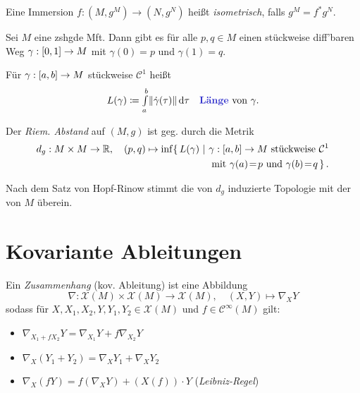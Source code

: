 \documentclass{cheat-sheet}
\newcommand{\abinterval}{\cinterval{a}{b}} %
\newcommand{\Cont}{\mathcal{C}} %
\newcommand{\VF}{\mathcal{X}} %
\begin{document}
\begin{defn}
  Eine Immersion $f : (M, g^M) \to (N, g^N)$ heißt \emph{isometrisch}, falls $g^M = f^* g^N$.
\end{defn}

\begin{prop}
  Sei $M$ eine zshgde Mft. Dann gibt es für alle $p, q \in M$ einen stückweise diff'baren Weg $\gamma : \left[ 0, 1 \right] \to M$ mit $\gamma(0) = p$ und $\gamma(1) = q$.
\end{prop}

\begin{defn}
  Für $\gamma : \abinterval \to M$ stückweise $\Cont^1$ heißt
  \[
    L(\gamma) \coloneqq \Int{a}{b}{\norm{\dot{\gamma}(\tau)}}{\tau}
    \quad \text{\emph{Länge} von $\gamma$.}
  \]
\end{defn}

\begin{defn}
  Der \emph{Riem. Abstand} auf $(M, g)$ ist geg. durch die Metrik
  \begin{align*}
    d_g : M \times M \to \R, \quad
    (p, q) \mapsto \inf \{\, L(\gamma) \,\,|\,\, & \gamma : \abinterval \to M \text{ stückweise } \Cont^{1}\\
    & \left. \text{mit $\gamma(a) \!=\! p$ und $\gamma(b) \!=\! q$} \, \right\}.
  \end{align*}
\end{defn}

\begin{teaser}
  Nach dem Satz von Hopf-Rinow stimmt die von $d_g$ induzierte Topologie mit der von $M$ überein.
\end{teaser}

\section{Kovariante Ableitungen}

\begin{defn}
  Ein \emph{Zusammenhang} (kov. Ableitung) ist eine Abbildung
  \[
    \nabla : \VF(M) \times \VF(M) \to \VF(M), \quad
    (X, Y) \mapsto \nabla_X Y
  \]
  sodass für $X, X_1, X_2, Y, Y_1, Y_2 \in \VF(M)$ und $f \in \Cont^\infty(M)$ gilt:
  \begin{itemize}
    \item $\nabla_{X_1 + f X_2} Y = \nabla_{X_1} Y + f \nabla_{X_2} Y$
    \item $\nabla_X (Y_1 + Y_2) = \nabla_X Y_1 + \nabla_X Y_2$
    \item $\nabla_X (f Y) = f \left( \nabla_X Y \right) + (X(f)) \cdot Y$ \enspace (\textit{Leibniz-Regel})
  \end{itemize}
\end{defn}
\end{document}
